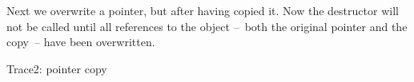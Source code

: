 Next we overwrite a pointer, but after having copied it. Now the
destructor will not be called until all references to the object
--~both the original pointer and the copy~-- have been overwritten.
%
\begin{block}{Trace2: pointer copy}
  \label{sl:shared-ptr-copy}
\end{block}

\endinput

\verbatimsnippet{shareptr1}
creates an object and overwrites the pointer, causing the object to be
destroyed:
\begin{verbatim}
set pointer1
calling constructor
overwrite pointer
calling destructor
\end{verbatim}

Illustrating how the object is not destroyed until all references are
gone:
%
\verbatimsnippet{shareptr2}
gives:
\begin{verbatim}
set pointer2
calling constructor
set pointer3 by copy
overwrite pointer2
overwrite pointer3
calling destructor
\end{verbatim}
